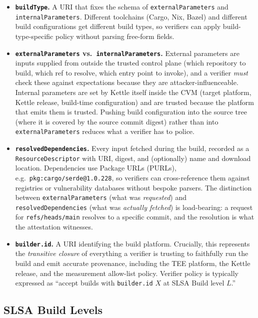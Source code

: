 \documentclass[11pt]{article}
\begin{document}
\begingroup\sloppy
\begin{itemize}
\item \textbf{\texttt{buildType}.} A URI that fixes the schema of \texttt{externalParameters} and \texttt{internalParameters}. Different toolchains (Cargo, Nix, Bazel) and different build configurations get different build types, so verifiers can apply build-type-specific policy without parsing free-form fields.
\item \textbf{\texttt{externalParameters} vs.\ \texttt{internalParameters}.} External parameters are inputs supplied from outside the trusted control plane (which repository to build, which ref to resolve, which entry point to invoke), and a verifier \emph{must} check these against expectations because they are attacker-influenceable. Internal parameters are set by Kettle itself inside the CVM (target platform, Kettle release, build-time configuration) and are trusted because the platform that emits them is trusted. Pushing build configuration into the source tree (where it is covered by the source commit digest) rather than into \texttt{externalParameters} reduces what a verifier has to police.
\item \textbf{\texttt{resolvedDependencies}.} Every input fetched during the build, recorded as a \texttt{ResourceDescriptor} with URI, digest, and (optionally) name and download location. Dependencies use Package URLs (PURLs), e.g.\ \texttt{pkg:\allowbreak cargo/\allowbreak serde@1.0.228}, so verifiers can cross-reference them against registries or vulnerability databases without bespoke parsers. The distinction between \texttt{externalParameters} (what was \emph{requested}) and \texttt{resolvedDependencies} (what was \emph{actually fetched}) is load-bearing: a request for \texttt{refs/heads/main} resolves to a specific commit, and the resolution is what the attestation witnesses.
\item \textbf{\texttt{builder.id}.} A URI identifying the build platform. Crucially, this represents the \emph{transitive closure} of everything a verifier is trusting to faithfully run the build and emit accurate provenance, including the TEE platform, the Kettle release, and the measurement allow-list policy. Verifier policy is typically expressed as ``accept builds with \texttt{builder.id} $X$ at SLSA Build level $L$.''
\end{itemize}
\endgroup

\subsection{SLSA Build Levels}
\end{document}
